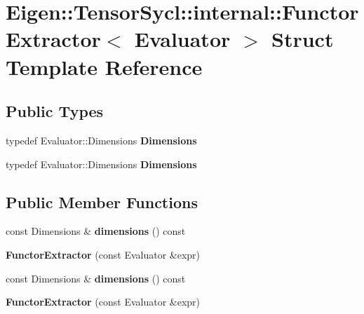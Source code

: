 \hypertarget{struct_eigen_1_1_tensor_sycl_1_1internal_1_1_functor_extractor}{}\section{Eigen\+:\+:Tensor\+Sycl\+:\+:internal\+:\+:Functor\+Extractor$<$ Evaluator $>$ Struct Template Reference}
\label{struct_eigen_1_1_tensor_sycl_1_1internal_1_1_functor_extractor}
\subsection*{Public Types}
\begin{DoxyCompactItemize}
\item 
\mbox{\label{struct_eigen_1_1_tensor_sycl_1_1internal_1_1_functor_extractor_a03db1b1e7bb7b6c27f3aa432ba51b41a}} 
typedef Evaluator\+::\+Dimensions {\bfseries Dimensions}
\item 
\mbox{\label{struct_eigen_1_1_tensor_sycl_1_1internal_1_1_functor_extractor_a03db1b1e7bb7b6c27f3aa432ba51b41a}} 
typedef Evaluator\+::\+Dimensions {\bfseries Dimensions}
\end{DoxyCompactItemize}
\subsection*{Public Member Functions}
\begin{DoxyCompactItemize}
\item 
\mbox{\label{struct_eigen_1_1_tensor_sycl_1_1internal_1_1_functor_extractor_a4d61a17b2400a06c7303a52d9a04fb3b}} 
const Dimensions \& {\bfseries dimensions} () const
\item 
\mbox{\label{struct_eigen_1_1_tensor_sycl_1_1internal_1_1_functor_extractor_aa4a0cf121553dffe851f78af601e724b}} 
{\bfseries Functor\+Extractor} (const Evaluator \&expr)
\item 
\mbox{\label{struct_eigen_1_1_tensor_sycl_1_1internal_1_1_functor_extractor_a4d61a17b2400a06c7303a52d9a04fb3b}} 
const Dimensions \& {\bfseries dimensions} () const
\item 
\mbox{\label{struct_eigen_1_1_tensor_sycl_1_1internal_1_1_functor_extractor_aa4a0cf121553dffe851f78af601e724b}} 
{\bfseries Functor\+Extractor} (const Evaluator \&expr)
\end{DoxyCompactItemize}
